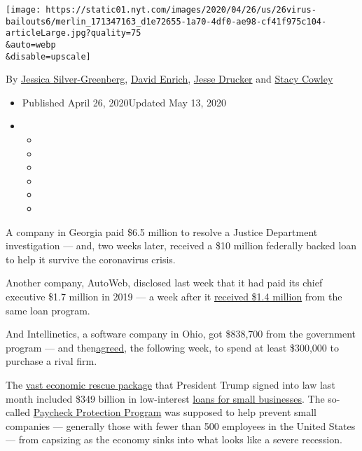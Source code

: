 \texttt{[image: https://static01.nyt.com/images/2020/04/26/us/26virus-bailouts6/merlin\_171347163\_d1e72655-1a70-4df0-ae98-cf41f975c104-articleLarge.jpg?quality=75\\\&auto=webp\\\&disable=upscale]}

By \href{https://www.nytimes.com/by/jessica-silver-greenberg}{Jessica
Silver-Greenberg}, \href{https://www.nytimes.com/by/david-enrich}{David
Enrich}, \href{https://www.nytimes.com/by/jesse-drucker}{Jesse Drucker}
and \href{https://www.nytimes.com/by/stacy-cowley}{Stacy Cowley}

\begin{itemize}
\item
  Published April 26, 2020Updated May 13, 2020
\item
  \begin{itemize}
  \item
  \item
  \item
  \item
  \item
  \item
  \end{itemize}
\end{itemize}

A company in Georgia paid \$6.5 million to resolve a Justice Department
investigation --- and, two weeks later, received a \$10 million
federally backed loan to help it survive the coronavirus crisis.

Another company, AutoWeb, disclosed last week that it had paid its chief
executive \$1.7 million in 2019 --- a week after it
\href{https://investor.autoweb.com/news-releases/news-release-details/autoweb-secures-14-million-loan-through-cares-act-paycheck}{received
\$1.4 million} from the same loan program.

And Intellinetics, a software company in Ohio, got \$838,700 from the
government program --- and
then\href{https://www.sec.gov/Archives/edgar/data/1081745/000149315220007017/form8k.htm}{agreed},
the following week, to spend at least \$300,000 to purchase a rival
firm.

The
\href{https://www.nytimes.com/2020/03/26/business/economy/coronavirus-relief-bill.html}{vast
economic rescue package} that President Trump signed into law last month
included \$349 billion in low-interest
\href{https://www.nytimes.com/2020/05/13/business/paycheck-protection-program-small-business.html}{loans
for small businesses}. The so-called
\href{https://www.nytimes.com/2020/05/06/business/small-businesses-loans-ppp-coronavirus.html}{Paycheck
Protection Program} was supposed to help prevent small companies ---
generally those with fewer than 500 employees in the United States ---
from capsizing as the economy sinks into what looks like a severe
recession.

